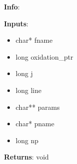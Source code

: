 \textbf{Info}:

\noindent \textbf{Inputs}:
\begin{itemize}
\item{char* fname}
\item{long oxidation\_ptr}
\item{long j}
\item{long line}
\item{char** params}
\item{char* pname}
\item{long np}
\end{itemize}

\noindent \textbf{Returns}: void
